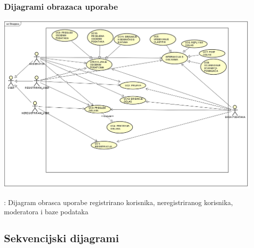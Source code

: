 			\eject	
			\begin{fig}
			    \subsubsection{Dijagrami obrazaca uporabe}
			    
                    \graphicspath{ {slike/} }
  
                    \centering
                    \includegraphics[width=\textwidth]{UseCase-slika.png}
                    \caption{: Dijagram obrasca uporabe registrirano korisnika, neregistriranog korisnika, moderatora i baze podataka}
               
			\eject	
			
			\end{fig}
				

			
			\subsection{Sekvencijski dijagrami}
				
